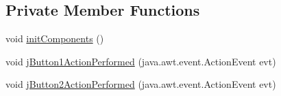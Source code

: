 \subsection*{Private Member Functions}
\begin{DoxyCompactItemize}
\item 
void \mbox{\hyperlink{class_interfaz_package_1_1_alta_diccionario_aad2d413b49e8cc72fe8cd13c3dd82416}{init\+Components}} ()
\item 
void \mbox{\hyperlink{class_interfaz_package_1_1_alta_diccionario_a07a3a587fdc3ee1428939151ae5963c0}{j\+Button1\+Action\+Performed}} (java.\+awt.\+event.\+Action\+Event evt)
\item 
void \mbox{\hyperlink{class_interfaz_package_1_1_alta_diccionario_aff2a0ab5bc48880d9115539f9dfbca78}{j\+Button2\+Action\+Performed}} (java.\+awt.\+event.\+Action\+Event evt)
\end{DoxyCompactItemize}
